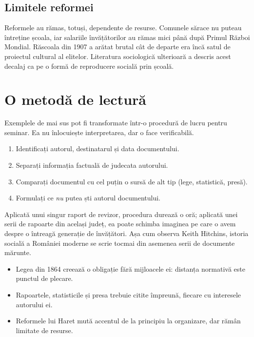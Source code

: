 \documentclass{texign-article}
\begin{document}
\subsection{Limitele reformei}

Reformele au rămas, totuși, dependente de resurse. Comunele sărace nu puteau întreține școala, iar salariile învățătorilor au rămas mici până după Primul Război Mondial.\cite[114]{murgescu2010} Răscoala din 1907 a arătat brutal cât de departe era încă satul de proiectul cultural al elitelor.\cite[115]{murgescu2010} Literatura sociologică ulterioară a descris acest decalaj ca pe o formă de reproducere socială prin școală.\cite[Cf.][18-21]{bourdieu1970}


\section{O metodă de lectură}\label{sec:metoda}

Exemplele de mai sus pot fi transformate într-o procedură de lucru pentru seminar. Ea nu înlocuiește interpretarea, dar o face verificabilă.

\begin{instructions}
\begin{enumerate}
\item Identificați autorul, destinatarul și data documentului.
\item Separați informația factuală de judecata autorului.
\item Comparați documentul cu cel puțin o sursă de alt tip (lege, statistică, presă).
\item Formulați ce \emph{nu} putea ști autorul documentului.
\end{enumerate}
\end{instructions}

Aplicată unui singur raport de revizor, procedura durează o oră; aplicată unei serii de rapoarte din același județ, ea poate schimba imaginea pe care o avem despre o întreagă generație de învățători. Așa cum observa Keith Hitchins, istoria socială a României moderne se scrie tocmai din asemenea serii de documente mărunte.\cite[cap.~5]{hitchins1994}

\begin{summary}
\begin{itemize}
\item Legea din 1864 creează o obligație fără mijloacele ei: distanța normativă este punctul de plecare.
\item Rapoartele, statisticile și presa trebuie citite împreună, fiecare cu interesele autorului ei.
\item Reformele lui Haret mută accentul de la principiu la organizare, dar rămân limitate de resurse.
\end{itemize}
\end{summary}
\end{document}
